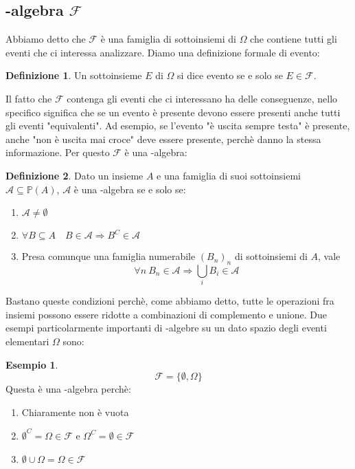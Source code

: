 \documentclass{article}
\theoremstyle{plain}
\theoremstyle{definition}
\newtheorem{definizione}{Definizione}[section]
\newtheorem{esempio}{Esempio}[section]
\theoremstyle{remark}
\begin{document}
\subsection{\sigma-algebra $\mathscr{F}$} %
\label{sub:sigma_algebra_f}
Abbiamo detto che $\mathscr{F}$ è una famiglia di sottoinsiemi di $\Omega$ che contiene tutti gli eventi che ci interessa analizzare. Diamo una definizione formale di evento:
\begin{definizione}
	Un sottoinsieme $E$ di $\Omega$ si dice evento se e solo se $E\in\mathscr{F}$.
\end{definizione}
Il fatto che $\mathscr{F}$ contenga gli eventi che ci interessano ha delle conseguenze, nello specifico significa che se un evento è presente devono essere presenti anche tutti gli eventi "equivalenti". Ad esempio, se l'evento "è uscita sempre testa" è presente, anche "non è uscita mai croce" deve essere presente, perchè danno la stessa informazione. Per questo $\mathscr{F}$ è una \sigma-algebra:
\begin{definizione}
	Dato un insieme $A$ e una famiglia di suoi sottoinsiemi $\mathscr{A}\subseteq\mathds{P}(A)$, $\mathscr{A}$ è una \sigma-algebra se e solo se:
	\begin{enumerate}
		\item $\mathscr{A}\neq\emptyset$
		\item $\forall B\subseteq A\quad B\in\mathscr{A}\Rightarrow B^C\in\mathscr{A}$
		\item Presa comunque una famiglia numerabile $(B_n)_n$ di sottoinsiemi di $A$, vale
		\begin{equation*}
			\forall n\ B_n\in\mathscr{A}\Rightarrow\bigcup_i B_i\in\mathscr{A}
		\end{equation*}
	\end{enumerate}
\end{definizione}
Bastano queste condizioni perchè, come abbiamo detto, tutte le operazioni fra insiemi possono essere ridotte a combinazioni di complemento e unione. Due esempi particolarmente importanti di \sigma-algebre su un dato spazio degli eventi elementari $\Omega$ sono:
\begin{esempio}
	\begin{equation*}
		\mathscr{F}=\{\emptyset, \Omega\}
	\end{equation*}
	Questa è una \sigma-algebra perchè:
	\begin{enumerate}
		\item Chiaramente non è vuota
		\item $\emptyset^C=\Omega\in\mathscr{F}$ e $\Omega^C=\emptyset\in\mathscr{F}$
		\item $\emptyset\cup\Omega=\Omega\in\mathscr{F}$
	\end{enumerate}
\end{esempio}
\end{document}
